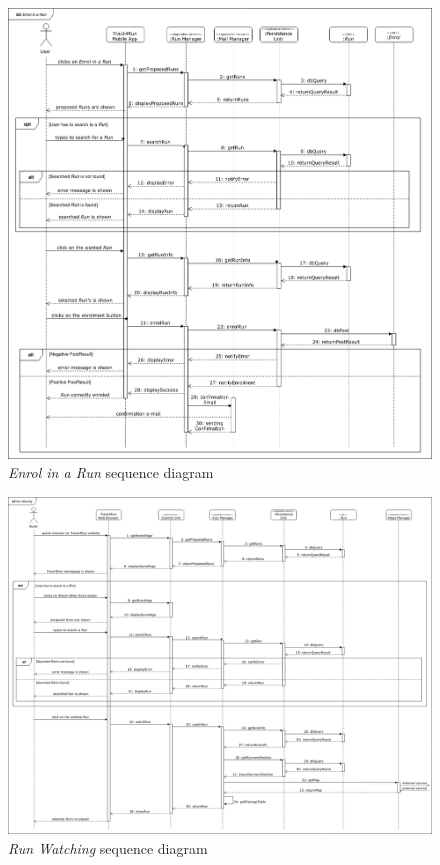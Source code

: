 \begin{figure}[H]
  \begin{center}
  	\includegraphics[width=\textwidth]{./img/sequence/enrolRun.png}
    \hspace{0.05\linewidth}
    \centering
    \caption{\textit{Enrol in a Run} sequence diagram}
		\label{img:enrolRun}
    \end{center}
\end{figure}

\begin{figure}[H]
  \begin{center}
  	\includegraphics[width=\textwidth]{./img/sequence/watchRun.png}
    \hspace{0.05\linewidth}
    \centering
    \caption{\textit{Run Watching} sequence diagram}
		\label{img:watchRun}
    \end{center}
\end{figure}


